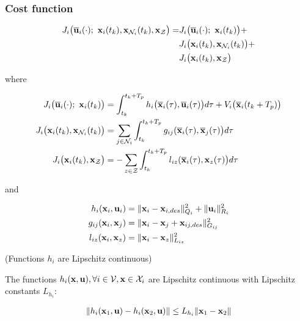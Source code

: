 \subsubsection{Cost function}

\begin{align}
  J_i \big(\overline{\bm{\mathbf{u}}}_i (\cdot);\ \bm{\mathbf{x}}_i(t_k), \bm{\mathbf{x}}_{\mathcal{N}_i}(t_k), \bm{\mathbf{x}}_{\mathcal{Z}}\big) =
    &J_i \big(\overline{\bm{\mathbf{u}}}_i (\cdot);\ \bm{\mathbf{x}}_i(t_k)\big) + \\
    &J_i \big(\bm{\mathbf{x}}_i (t_k), \bm{\mathbf{x}}_{\mathcal{N}_i}(t_k)\big) + \\
    &J_i \big(\bm{\mathbf{x}}_i (t_k), \bm{\mathbf{x}}_{\mathcal{Z}}\big)
\end{align}

where

\begin{align}
  J_i \big(\overline{\bm{\mathbf{u}}}_i (\cdot);\ \bm{\mathbf{x}}_i(t_k)\big) &=
    \int_{t_k}^{t_k + T_p} h_i \big(\overline{\bm{\mathbf{x}}}_i (\tau), \overline{\bm{\mathbf{u}}}_i (\tau)\big) d \tau +
    V_i \big(\overline{\bm{\mathbf{x}}}_i (t_k + T_p)\big) \\
  J_i \big(\bm{\mathbf{x}}_i (t_k), \bm{\mathbf{x}}_{\mathcal{N}_i}(t_k)\big) &=
    \sum_{j \in \mathcal{N}_i} \int_{t_k}^{t_k + T_p} g_{ij} (\overline{\bm{\mathbf{x}}}_i (\tau), \overline{\bm{\mathbf{x}}}_j (\tau)\big) d \tau \\
  J_i \big(\bm{\mathbf{x}}_i (t_k), \bm{\mathbf{x}}_{\mathcal{Z}}\big) &=
    -\sum_{z \in \mathcal{Z}} \int_{t_k}^{t_k + T_p} l_{iz} (\overline{\bm{\mathbf{x}}}_i (\tau), \bm{\mathbf{x}}_z (\tau)\big) d \tau
\end{align}

and

\begin{align}
  h_i(\bm{\mathbf{x}}_i, \bm{\mathbf{u}}_i) &= \| \bm{\mathbf{x}}_i - \bm{\mathbf{x}}_{i,des}\|_{Q_i}^2 + \| \bm{\mathbf{u}}_i\|_{R_i}^2 \\
  g_{ij}(\bm{\mathbf{x}}_i, \bm{\mathbf{x}}_j) &= \| \bm{\mathbf{x}}_i - \bm{\mathbf{x}}_j + \bm{\mathbf{x}}_{ij,des} \|_{G_{ij}}^2 \\
  l_{iz}(\bm{\mathbf{x}}_i, \bm{\mathbf{x}}_z) &= \| \bm{\mathbf{x}}_i - \bm{\mathbf{x}}_z \|_{L_{iz}}^2 \\
\end{align}


\begin{gg_box}
\begin{assumption} (Functions $h_i$ are Lipschitz continuous)

  The functions $h_i(\bm{\mathbf{x}}, \bm{\mathbf{u}}), \forall i \in \mathcal{V}, \bm{\mathbf{x}} \in \mathcal{X}_i$
  are Lipschitz continuous with Lipschitz constants $L_{h_i}$:

  \begin{align}
    \| h_i(\bm{\mathbf{x}}_1, \bm{\mathbf{u}}) - h_i(\bm{\mathbf{x}}_2, \bm{\mathbf{u}})\| \leq L_{h_i} \|\bm{\mathbf{x}}_1 - \bm{\mathbf{x}}_2 \|
  \end{align}

  \label{ass:h_i_Lipschitz}
\end{assumption}
\end{gg_box}


